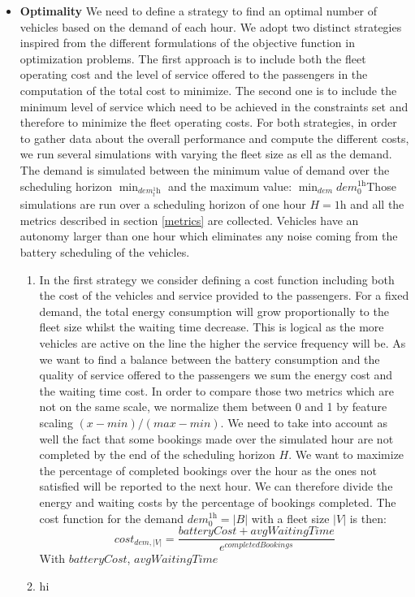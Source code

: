 \documentclass[12pt,a4paper]{article}
\begin{document}
\begin{itemize}
\item \textbf{Optimality} We need to define a strategy to find an optimal number of vehicles based on the demand of each hour. We adopt two distinct strategies inspired from the different formulations of the objective function in optimization problems. The first approach is to include both the fleet operating cost and the level of service offered to the passengers in the computation of the total cost to minimize. The second one is to include the minimum level of service which need to be achieved in the constraints set and therefore to minimize the fleet operating costs. For both strategies, in order to gather data about the overall performance and compute the different costs, we run several simulations with varying the fleet size as ell as the demand. The demand is simulated between the minimum value of demand over the scheduling horizon $\min_{dem_t^{1}\text{h}}$ and the maximum value:  $\min_{dem} dem_{0}^{1\text{h}}$Those simulations are run over a scheduling horizon of one hour $H = 1$h and all the metrics described in section \ref{metrics} are collected. Vehicles have an autonomy larger than one hour which eliminates any noise coming from the battery scheduling of the vehicles. 
\begin{enumerate}
\setlength\itemsep{1pt} 
\item In the first strategy we consider defining a cost function including both the cost of the vehicles and service provided to the passengers. For a fixed demand, the total energy consumption will grow proportionally to the fleet size whilst the waiting time decrease. This is logical as the more vehicles are active on the line the higher the service frequency will be. As we want to find a balance between the battery consumption and the quality of service offered to the passengers we sum the energy cost and the waiting time cost. In order to compare those two metrics which are not on the same scale, we normalize them between 0 and 1 by feature scaling $(x-min)/(max-min)$. We need to take into account as well the fact that some bookings made over the simulated hour are not completed by the end of the scheduling horizon $H$. We want to maximize the percentage of completed bookings over the hour as the ones not satisfied will be reported to the next hour. We can therefore divide the energy and waiting costs by the percentage of bookings completed. The cost function for the demand $dem_{0}^{1\text{h}} = |B|$ with a fleet size $|V|$ is then:
$$ cost_{dem, |V|} = \frac{batteryCost + avgWaitingTime}{e^{completedBookings}}$$
With $batteryCost$, $avgWaitingTime $
\item hi
\end{enumerate}
\end{itemize}
\end{document}
